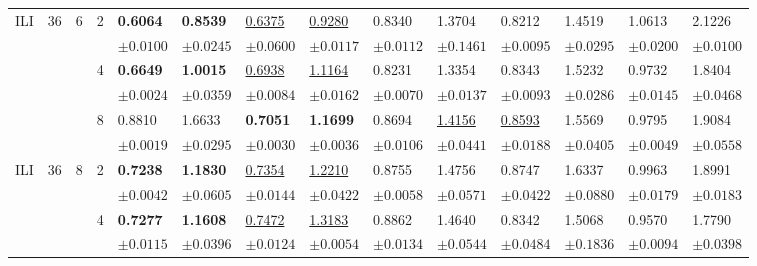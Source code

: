 {\begin{table}[tb]
{\begin{tabular}{p{10mm}p{2mm}p{2mm}p{4mm}p{10mm}p{10mm}p{10mm}p{10mm}p{10mm}p{10mm}p{10mm}p{10mm}p{10mm}p{10mm}}

\midrule
\multirow{6}{*}{ILI} 
&\multirow{6}{*}{36} &\multirow{6}{*}{6} &\multirow{2}{*}{2} &\textbf{0.6064}  &\textbf{0.8539} &\underline{0.6375} &\underline{0.9280} &0.8340   &1.3704 &0.8212 &	1.4519   &1.0613  &2.1226  \\
& & & &$\pm 0.0100  $&$\pm 0.0245$&$\pm 0.0600$&$\pm 0.0117 $&$\pm 0.0112  $&$\pm 0.1461 $&$\pm 0.0095 $&$	\pm 0.0295   $&$\pm 0.0200  $&$\pm 0.0100$\\

& & &\multirow{2}{*}{4} &\textbf{0.6649} &\textbf{1.0015} &\underline{0.6938} &\underline{1.1164} &0.8231  &1.3354 &0.8343 	&1.5232  &0.9732  &1.8404 \\
& & & &$\pm 0.0024  $&$\pm 0.0359 $&$\pm 0.0084$&$\pm 0.0162 $&$\pm 0.0070  $&$\pm 0.0137$&$\pm 0.0093 $&$	\pm 0.0286   $&$\pm 0.0145  $&$\pm 0.0468$\\

& & &\multirow{2}{*}{8} &0.8810 &1.6633 &\textbf{0.7051} &\textbf{1.1699} &0.8694  &\underline{1.4156} &\underline{0.8593} &1.5569  &0.9795  &1.9084 \\
& & & &$\pm 0.0019  $&$\pm 0.0295 $&$\pm 0.0030$&$\pm 0.0036 $&$\pm 0.0106  $&$\pm 0.0441$&$\pm 0.0188 $&$	\pm 0.0405   $&$\pm 0.0049  $&$\pm 0.0558$\\

\midrule
\multirow{6}{*}{ILI} 
&\multirow{6}{*}{36} &\multirow{6}{*}{8} &\multirow{2}{*}{2} &\textbf{0.7238}  &\textbf{1.1830} &\underline{0.7354} &\underline{1.2210} &0.8755   &1.4756 &0.8747 &	1.6337   &0.9963  &1.8991 \\

& & & &$\pm 0.0042  $&$\pm 0.0605 $&$\pm 0.0144$&$\pm 0.0422 $&$\pm 0.0058  $&$\pm 0.0571$&$\pm 0.0422 $&$	\pm 0.0880   $&$\pm 0.0179  $&$\pm 0.0183$\\

& & &\multirow{2}{*}{4} &\textbf{0.7277}  &\textbf{1.1608} &\underline{0.7472} &\underline{1.3183} &0.8862   &1.4640 &0.8342 &	1.5068   &0.9570  &1.7790 \\

& & & &$\pm 0.0115  $&$\pm 0.0396 $&$\pm 0.0124$&$\pm 0.0054 $&$\pm 0.0134  $&$\pm 0.0544$&$\pm 0.0484 $&$	\pm 0.1836   $&$\pm 0.0094  $&$\pm 0.0398$\\


\end{tabular}}
\end{table}}
